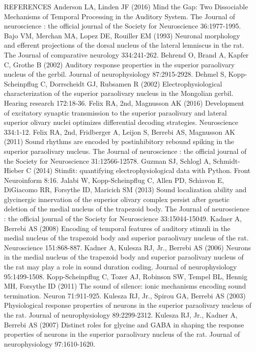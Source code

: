 \documentclass{article}
\begin{document}
REFERENCES
Anderson LA, Linden JF (2016) Mind the Gap: Two Dissociable Mechanisms of Temporal Processing in the Auditory System. The Journal of neuroscience : the official journal of the Society for Neuroscience 36:1977-1995.
Bajo VM, Merchan MA, Lopez DE, Rouiller EM (1993) Neuronal morphology and efferent projections of the dorsal nucleus of the lateral lemniscus in the rat. The Journal of comparative neurology 334:241-262.
Behrend O, Brand A, Kapfer C, Grothe B (2002) Auditory response properties in the superior paraolivary nucleus of the gerbil. Journal of neurophysiology 87:2915-2928.
Dehmel S, Kopp-Scheinpflug C, Dorrscheidt GJ, Rubsamen R (2002) Electrophysiological characterization of the superior paraolivary nucleus in the Mongolian gerbil. Hearing research 172:18-36.
Felix RA, 2nd, Magnusson AK (2016) Development of excitatory synaptic transmission to the superior paraolivary and lateral superior olivary nuclei optimizes differential decoding strategies. Neuroscience 334:1-12.
Felix RA, 2nd, Fridberger A, Leijon S, Berrebi AS, Magnusson AK (2011) Sound rhythms are encoded by postinhibitory rebound spiking in the superior paraolivary nucleus. The Journal of neuroscience : the official journal of the Society for Neuroscience 31:12566-12578.
Guzman SJ, Schlogl A, Schmidt-Hieber C (2014) Stimfit: quantifying electrophysiological data with Python. Front Neuroinform 8:16.
Jalabi W, Kopp-Scheinpflug C, Allen PD, Schiavon E, DiGiacomo RR, Forsythe ID, Maricich SM (2013) Sound localization ability and glycinergic innervation of the superior olivary complex persist after genetic deletion of the medial nucleus of the trapezoid body. The Journal of neuroscience : the official journal of the Society for Neuroscience 33:15044-15049.
Kadner A, Berrebi AS (2008) Encoding of temporal features of auditory stimuli in the medial nucleus of the trapezoid body and superior paraolivary nucleus of the rat. Neuroscience 151:868-887.
Kadner A, Kulesza RJ, Jr., Berrebi AS (2006) Neurons in the medial nucleus of the trapezoid body and superior paraolivary nucleus of the rat may play a role in sound duration coding. Journal of neurophysiology 95:1499-1508.
Kopp-Scheinpflug C, Tozer AJ, Robinson SW, Tempel BL, Hennig MH, Forsythe ID (2011) The sound of silence: ionic mechanisms encoding sound termination. Neuron 71:911-925.
Kulesza RJ, Jr., Spirou GA, Berrebi AS (2003) Physiological response properties of neurons in the superior paraolivary nucleus of the rat. Journal of neurophysiology 89:2299-2312.
Kulesza RJ, Jr., Kadner A, Berrebi AS (2007) Distinct roles for glycine and GABA in shaping the response properties of neurons in the superior paraolivary nucleus of the rat. Journal of neurophysiology 97:1610-1620.
\end{document}
